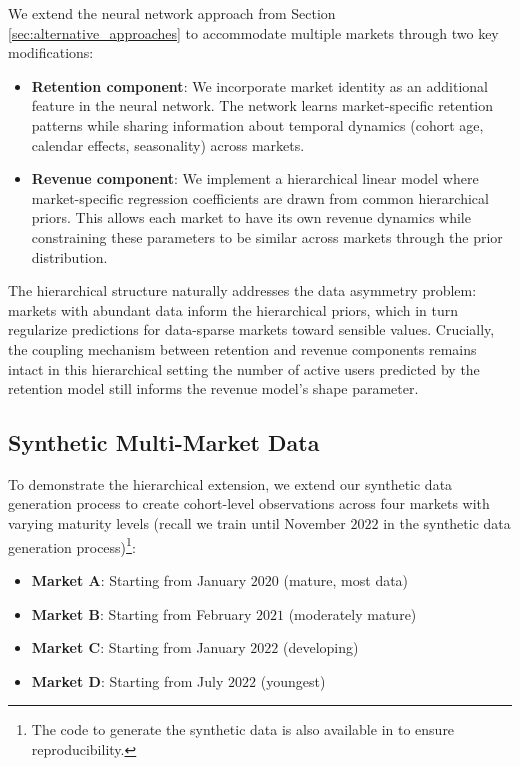 \documentclass[11pt]{amsart}
\theoremstyle{definition}
\begin{document}
We extend the neural network approach from Section \ref{sec:alternative_approaches} to accommodate multiple markets through two key modifications:

\begin{itemize}
    \item \textbf{Retention component}: We incorporate market identity as an additional feature in the neural network. The
          network learns market-specific retention patterns while sharing information about temporal dynamics (cohort age,
          calendar effects, seasonality) across markets.

    \item \textbf{Revenue component}: We implement a hierarchical linear model where market-specific regression coefficients
          are drawn from common hierarchical priors. This allows each market to have its own revenue dynamics while constraining
          these parameters to be similar across markets through the prior distribution.
\end{itemize}

The hierarchical structure naturally addresses the data asymmetry problem: markets with abundant data inform the hierarchical
priors, which in turn regularize predictions for data-sparse markets toward sensible values. Crucially, the coupling mechanism
between retention and revenue components remains intact in this hierarchical setting the number of active users predicted by
the retention model still informs the revenue model's shape parameter.

\subsection{Synthetic Multi-Market Data}

To demonstrate the hierarchical extension, we extend our synthetic data generation process to create cohort-level observations
across four markets with varying maturity levels (recall we train until November $2022$ in the synthetic data generation process)\footnote{
    The code to generate the synthetic data is also available in \cite{orduz_revenue_retention_data_code} to ensure reproducibility.
}:

\begin{itemize}
    \item \textbf{Market A}: Starting from January $2020$ (mature, most data)
    \item \textbf{Market B}: Starting from February $2021$ (moderately mature)
    \item \textbf{Market C}: Starting from January $2022$ (developing)
    \item \textbf{Market D}: Starting from July $2022$ (youngest)
\end{itemize}
\end{document}
